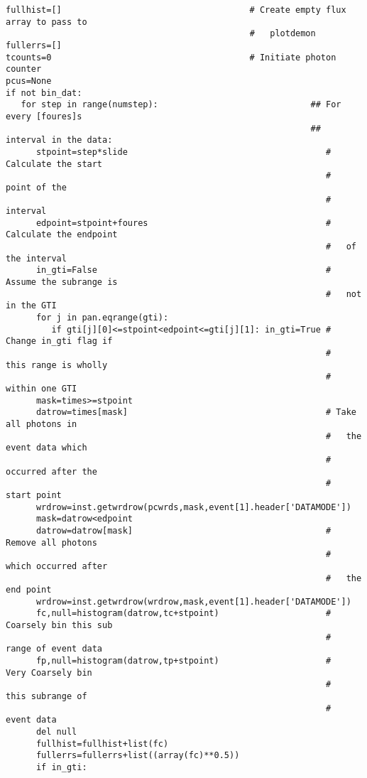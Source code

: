 \begin{verbatim}
fullhist=[]                                     # Create empty flux array to pass to
                                                #   plotdemon
fullerrs=[]
tcounts=0                                       # Initiate photon counter
pcus=None
if not bin_dat:
   for step in range(numstep):                              ## For every [foures]s
                                                            ##   interval in the data:
      stpoint=step*slide                                       # Calculate the start
                                                               #   point of the
                                                               #   interval
      edpoint=stpoint+foures                                   # Calculate the endpoint
                                                               #   of the interval
      in_gti=False                                             # Assume the subrange is
                                                               #   not in the GTI
      for j in pan.eqrange(gti):
         if gti[j][0]<=stpoint<edpoint<=gti[j][1]: in_gti=True # Change in_gti flag if
                                                               #   this range is wholly
                                                               #   within one GTI
      mask=times>=stpoint
      datrow=times[mask]                                       # Take all photons in
                                                               #   the event data which
                                                               #   occurred after the
                                                               #   start point
      wrdrow=inst.getwrdrow(pcwrds,mask,event[1].header['DATAMODE'])
      mask=datrow<edpoint
      datrow=datrow[mask]                                      # Remove all photons
                                                               #   which occurred after
                                                               #   the end point
      wrdrow=inst.getwrdrow(wrdrow,mask,event[1].header['DATAMODE'])
      fc,null=histogram(datrow,tc+stpoint)                     # Coarsely bin this sub
                                                               #   range of event data
      fp,null=histogram(datrow,tp+stpoint)                     #   Very Coarsely bin
                                                               #   this subrange of
                                                               #   event data
      del null
      fullhist=fullhist+list(fc)
      fullerrs=fullerrs+list((array(fc)**0.5))
      if in_gti:

\end{verbatim}
